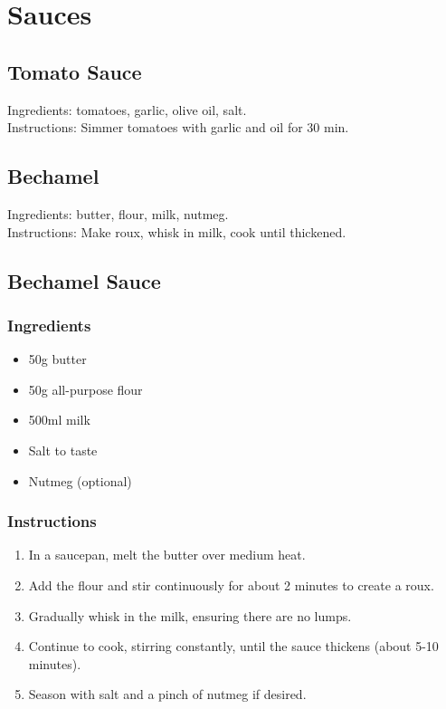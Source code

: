 \chapter{Sauces}

\section*{Tomato Sauce}
Ingredients: tomatoes, garlic, olive oil, salt. \\
Instructions: Simmer tomatoes with garlic and oil for 30 min.

\section*{Bechamel}
Ingredients: butter, flour, milk, nutmeg. \\
Instructions: Make roux, whisk in milk, cook until thickened.

\section{Bechamel Sauce}
\subsection*{Ingredients}
\begin{itemize}
    \item 50g butter
    \item 50g all-purpose flour
    \item 500ml milk
    \item Salt to taste
    \item Nutmeg (optional)
\end{itemize}

\subsection*{Instructions}
\begin{enumerate}
    \item In a saucepan, melt the butter over medium heat.
    \item Add the flour and stir continuously for about 2 minutes to create a roux.
    \item Gradually whisk in the milk, ensuring there are no lumps.
    \item Continue to cook, stirring constantly, until the sauce thickens (about 5-10 minutes).
    \item Season with salt and a pinch of nutmeg if desired.
\end{enumerate}

